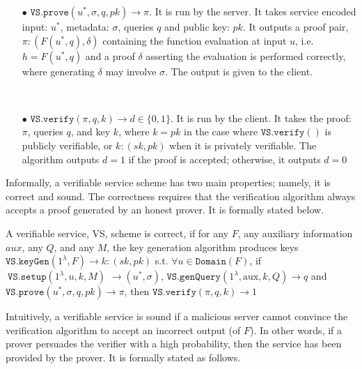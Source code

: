 \begin{definition}[VS Scheme]
\begin{itemize}


\item[$\bullet$] $\mathtt{VS.prove}(u^{\scriptscriptstyle *},\sigma,q,pk)\rightarrow \pi$. It is run by the server. It  takes service encoded input: $u^{\scriptscriptstyle *}$, metadata: $\sigma$,   queries $q$ and public key: $pk$. It outputs a proof pair, $\pi:(F(u^{\scriptscriptstyle *},q),\delta)$ containing the function evaluation at  input $u$, i.e. $h=F(u^{\scriptscriptstyle *},q)$ and a proof $\delta$ asserting the evaluation is performed correctly, where generating $\delta$ may involve $\sigma$. The output is given to the client. %

\

\item[$\bullet$] $\mathtt{VS.verify}(\pi,q,k)\rightarrow d\in\{0,1\}$. It is run by the client. It takes the proof: $\pi$,   queries $q$, and  key  $k$, where $k=pk$  in the case where $\mathtt{VS.verify}()$ is publicly verifiable, or $k:(sk,pk)$ when it is privately verifiable. The algorithm  outputs $d=1$ if the proof is accepted; otherwise, it outputs $d=0$ 
\end{itemize}
\end{definition}


Informally, a verifiable service scheme has two main properties; namely, it is correct and sound. The correctness requires that  the verification algorithm always accepts a proof generated by an honest prover.  It is formally stated below.

\begin{definition}[VS Correctness] A verifiable service, VS, scheme is  correct,  if for any $F$,  any auxiliary information $aux$, any  $Q$, and any $M$, the key generation algorithm produces keys $\mathtt{VS.keyGen}(1^{\lambda},F)\rightarrow k:(sk,pk)$ s.t. $\forall u \in \mathtt{Domain}(F)$, if $\ \mathtt{VS.setup}(1^{\lambda}, u,k,M)$ $\rightarrow (u^{\scriptscriptstyle *},\sigma)$,  $\mathtt{VS.genQuery}(1^{\lambda}, \text{aux},k,Q)\rightarrow q$ and $\mathtt{VS.prove}(u^{\scriptscriptstyle *},\sigma,q,pk)\rightarrow \pi$, then $\mathtt{VS.verify}(\pi,q,k)\rightarrow 1$
\end{definition}

Intuitively, a verifiable service is sound  if a malicious server cannot convince the verification algorithm to accept an incorrect output (of $F$). In other words, if a prover persuades the verifier with a high probability, then the service has been provided by the prover. It is  formally stated as follows.



